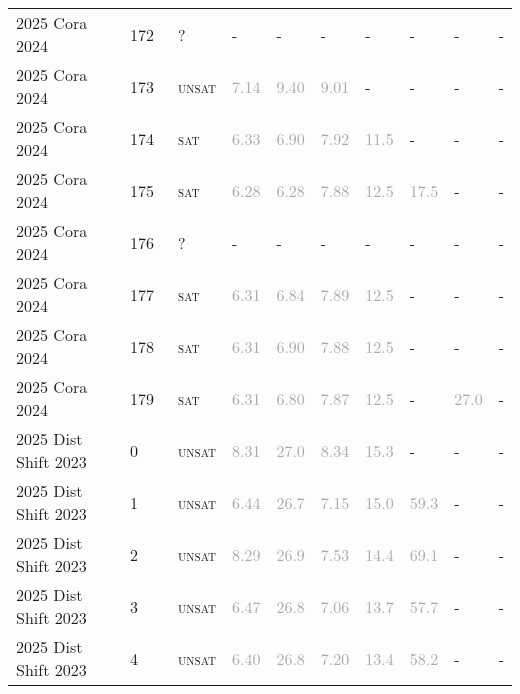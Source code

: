 \begin{center}
{\begin{longtable}{@{}llllllllll@{}}
2025 Cora 2024 & 172 & ~? & - & - & - & - & - & - & - \\
2025 Cora 2024 & 173 & ~\textsc{unsat} & \textcolor{darkgray}{7.14} & \textcolor{darkgray}{9.40} & \textcolor{darkgray}{9.01} & - & - & - & - \\
2025 Cora 2024 & 174 & ~\textsc{sat} & \textcolor{darkgray}{6.33} & \textcolor{darkgray}{6.90} & \textcolor{darkgray}{7.92} & \textcolor{darkgray}{11.5} & - & - & - \\
2025 Cora 2024 & 175 & ~\textsc{sat} & \textcolor{darkgray}{6.28} & \textcolor{darkgray}{6.28} & \textcolor{darkgray}{7.88} & \textcolor{darkgray}{12.5} & \textcolor{darkgray}{17.5} & - & - \\
2025 Cora 2024 & 176 & ~? & - & - & - & - & - & - & - \\
2025 Cora 2024 & 177 & ~\textsc{sat} & \textcolor{darkgray}{6.31} & \textcolor{darkgray}{6.84} & \textcolor{darkgray}{7.89} & \textcolor{darkgray}{12.5} & - & - & - \\
2025 Cora 2024 & 178 & ~\textsc{sat} & \textcolor{darkgray}{6.31} & \textcolor{darkgray}{6.90} & \textcolor{darkgray}{7.88} & \textcolor{darkgray}{12.5} & - & - & - \\
2025 Cora 2024 & 179 & ~\textsc{sat} & \textcolor{darkgray}{6.31} & \textcolor{darkgray}{6.80} & \textcolor{darkgray}{7.87} & \textcolor{darkgray}{12.5} & - & \textcolor{darkgray}{27.0} & - \\
\midrule
2025 Dist Shift 2023 & 0 & ~\textsc{unsat} & \textcolor{darkgray}{8.31} & \textcolor{darkgray}{27.0} & \textcolor{darkgray}{8.34} & \textcolor{darkgray}{15.3} & - & - & - \\
2025 Dist Shift 2023 & 1 & ~\textsc{unsat} & \textcolor{darkgray}{6.44} & \textcolor{darkgray}{26.7} & \textcolor{darkgray}{7.15} & \textcolor{darkgray}{15.0} & \textcolor{darkgray}{59.3} & - & - \\
2025 Dist Shift 2023 & 2 & ~\textsc{unsat} & \textcolor{darkgray}{8.29} & \textcolor{darkgray}{26.9} & \textcolor{darkgray}{7.53} & \textcolor{darkgray}{14.4} & \textcolor{darkgray}{69.1} & - & - \\
2025 Dist Shift 2023 & 3 & ~\textsc{unsat} & \textcolor{darkgray}{6.47} & \textcolor{darkgray}{26.8} & \textcolor{darkgray}{7.06} & \textcolor{darkgray}{13.7} & \textcolor{darkgray}{57.7} & - & - \\
2025 Dist Shift 2023 & 4 & ~\textsc{unsat} & \textcolor{darkgray}{6.40} & \textcolor{darkgray}{26.8} & \textcolor{darkgray}{7.20} & \textcolor{darkgray}{13.4} & \textcolor{darkgray}{58.2} & - & - \\

\end{longtable}}
\end{center}
